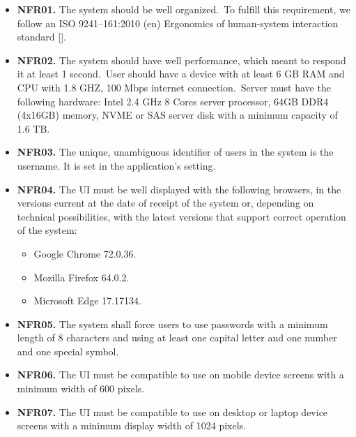 \begin{itemize}
    \item \textbf{NFR01.} The system should be well organized.\ To fulfill this requirement, we follow an
    ISO 9241--161:2010 (en) Ergonomics of human-system interaction standard [\cite{iso2010ergonomics}].
    \item \textbf{NFR02.} The system should have well performance, which meant to respond it at
    least 1 second.\ User should have a device with at least 6 GB RAM and CPU with 1.8
    GHZ, 100 Mbps internet connection.\ Server must have the following hardware: Intel
    2.4 GHz 8 Cores server processor, 64GB DDR4 (4x16GB) memory, NVME or SAS
    server disk with a minimum capacity of 1.6 TB\@.
    \item \textbf{NFR03.} The unique, unambiguous identifier of users in the system is the username.
    It is set in the application’s setting.
    \item \textbf{NFR04.} The UI must be well displayed with the following browsers, in the versions
    current at the date of receipt of the system or, depending on technical possibilities,
    with the latest versions that support correct operation of the system:
    \begin{itemize}
        \item Google Chrome 72.0.36.
        \item Mozilla Firefox 64.0.2.
        \item Microsoft Edge 17.17134.
    \end{itemize}
    \item \textbf{NFR05.} The system shall force users to use passwords with a minimum length of 8
    characters and using at least one capital letter and one number and one special symbol.
    \item \textbf{NFR06.} The UI must be compatible to use on mobile device screens with a minimum
    width of 600 pixels.
    \item \textbf{NFR07.} The UI must be compatible to use on desktop or laptop device screens with a
    minimum display width of 1024 pixels.
\end{itemize}